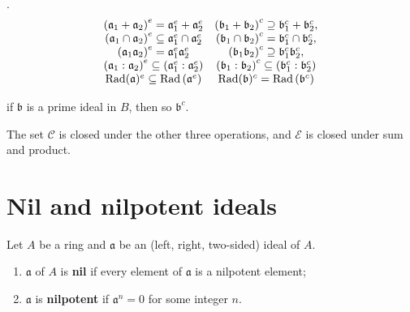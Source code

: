 \begin{proposition}
    \label{pro: Contraction and extension and other operations}
    .
    \begin{equation*}
        \begin{array}{cc}
            \left(\mathfrak{a}_1+\mathfrak{a}_2\right)^e=\mathfrak{a}_1^e+\mathfrak{a}_2^e                         & \left(\mathfrak{b}_1+\mathfrak{b}_2\right)^c \supseteq \mathfrak{b}_1^c+\mathfrak{b}_2^c,              \\
            \left(\mathfrak{a}_1 \cap \mathfrak{a}_2\right)^e \subseteq \mathfrak{a}_1^e \cap \mathfrak{a}_2^e     & \left(\mathfrak{b}_1 \cap \mathfrak{b}_2\right)^c=\mathfrak{b}_1^c \cap \mathfrak{b}_2^c,              \\
            \left(\mathfrak{a}_1 \mathfrak{a}_2\right)^e=\mathfrak{a}_1^e \mathfrak{a}_2^e                         & \left(\mathfrak{b}_1 \mathfrak{b}_2\right)^c \supseteq \mathfrak{b}_1^c \mathfrak{b}_2^c,              \\

            \left(\mathfrak{a}_1: \mathfrak{a}_2\right)^e \subseteq\left(\mathfrak{a}_1^e: \mathfrak{a}_2^e\right) & \left(\mathfrak{b}_1: \mathfrak{b}_2\right)^c \subseteq\left(\mathfrak{b}_1^c: \mathfrak{b}_2^c\right) \\
            \operatorname{\operatorname{Rad}}(\mathfrak{a})^e \subseteq \operatorname{\operatorname{Rad}}\left(\mathfrak{a}^e\right)                                         & \operatorname{\operatorname{Rad}}(\mathfrak{b})^c=\operatorname{\operatorname{Rad}}\left(\mathfrak{b}^c\right)
        \end{array}
    \end{equation*}

    if $\mathfrak{b}$ is a prime ideal in $B$, then so $\mathfrak{b}^c$.

    The set $\mathcal{C}$ is closed under the other three operations, and $\mathcal{E}$ is closed under sum and product.




\end{proposition}

\section{Nil and nilpotent ideals} %



\begin{definition}
    Let $A$ be a ring and $\mathfrak{a}$ be an (left, right, two-sided) ideal of $A$.
    \begin{enumerate}
        \item
              $\mathfrak{a}$ of $A$ is \textbf{nil} if every element of $\mathfrak{a}$ is a nilpotent element;
        \item
              $\mathfrak{a}$ is \textbf{nilpotent} if $\mathfrak{a}^n=0$ for some integer $n$.
    \end{enumerate}
\end{definition}


